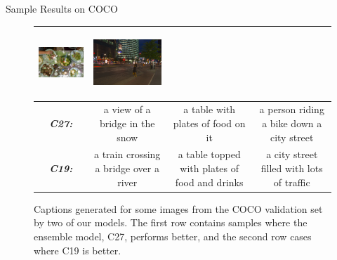 \documentclass{beamer}
\newcommand{\mcCell}[1]{\multicolumn{1}{|c|}{#1}}
\begin{document}
\begin{frame}{Sample Results on COCO}
\begin{figure}[h]
\begin{center}
{\begin{tabular}{c|c|c|c|}
    \includegraphics[width=0.25\linewidth,height=2.5cm]{images/COCO_val2014_000000218404.jpg} &
    \includegraphics[width=0.25\linewidth,height=2.5cm]{images/COCO_val2014_000000119516.jpg} \\\hline
    \mcCell{\textbf{\em\scriptsize C27:}}& \parbox[c][][c]{0.25\linewidth}{\smallskip \scriptsize a view of a bridge in the snow\smallskip} &
     \parbox[c][][c]{0.25\linewidth}{\smallskip \scriptsize a table with plates of food on it\smallskip}&
     \parbox[c][][c]{0.25\linewidth}{\smallskip \scriptsize a person riding a bike down a city street\smallskip}\\\hline
     \mcCell{\textbf{\em\scriptsize C19:}}& \parbox[c][][c]{0.25\linewidth}{\smallskip \scriptsize a train crossing a bridge over a river\smallskip} &
     \parbox[c][][c]{0.25\linewidth}{\smallskip \scriptsize a table topped with plates of food and drinks\smallskip}&
     \parbox[c][][c]{0.25\linewidth}{\smallskip \scriptsize a city street filled with lots of traffic\smallskip}\\\hline
  \end{tabular}
  }
  \end{center}
  \caption{Captions generated for some images from the COCO validation set by two of our
    models. The first row contains samples where the ensemble model,
    C27, performs better, and the second row cases where C19 is
    better.}
  \label{fig:cococapSamps}
\end{figure}

\end{frame}
\end{document}
